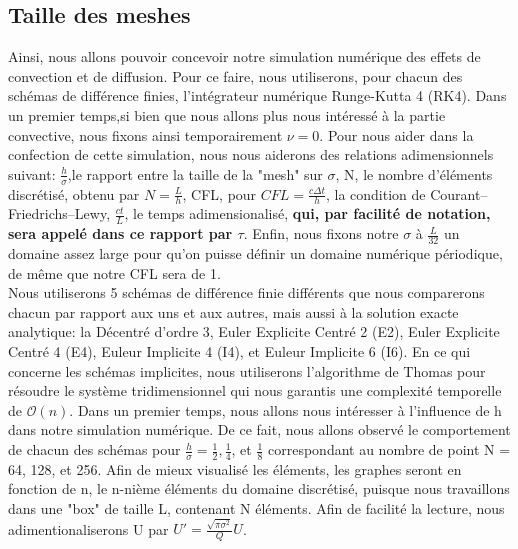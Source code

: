 \documentclass{article}
\begin{document}
\subsection{Taille des meshes}
Ainsi, nous allons pouvoir concevoir notre simulation numérique des effets de convection et de diffusion. Pour ce faire, nous utiliserons, pour chacun des schémas de différence finies, l'intégrateur numérique Runge-Kutta 4 (RK4). Dans un premier temps,si bien que nous allons plus nous intéressé à la partie convective, nous fixons ainsi temporairement $\nu = 0$. Pour nous aider dans la confection de cette simulation, nous nous aiderons des relations adimensionnels suivant: $\frac{h}{\sigma}$,le rapport entre la taille de la "mesh" sur $\sigma$, N, le nombre d'éléments discrétisé, obtenu par $N = \frac{L}{h}$, CFL, pour $CFL = \frac{c\Delta t}{h}$, la condition de Courant–Friedrichs–Lewy, $\frac{ct}{L}$, le temps adimensionalisé, \textbf{qui, par facilité de notation, sera appelé dans ce rapport par $\tau$}. Enfin, nous fixons notre $\sigma$ à $\frac{L}{32}$ un domaine assez large pour qu'on puisse définir un domaine numérique périodique, de même que notre CFL sera de 1.\\

Nous utiliserons 5 schémas de différence finie différents que nous comparerons chacun par rapport aux uns et aux autres, mais aussi à la solution exacte analytique: la Décentré d'ordre 3, Euler Explicite Centré 2 (E2), Euler Explicite Centré 4 (E4), Euleur Implicite 4 (I4), et Euleur Implicite 6 (I6). En ce qui concerne les schémas implicites, nous utiliserons l'algorithme de Thomas pour résoudre le système tridimensionnel qui nous garantis une complexité temporelle de $\mathcal{O}(n)$. Dans un premier temps, nous allons nous intéresser à l'influence de h dans notre simulation numérique. De ce fait, nous allons observé le comportement de chacun des schémas pour $\frac{h}{\sigma} = \frac{1}{2}, \frac{1}{4}$, et $\frac{1}{8}$ correspondant au nombre de point N = 64, 128, et 256. Afin de mieux visualisé les éléments, les graphes seront en fonction de n, le n-nième éléments du domaine discrétisé, puisque nous travaillons dans une "box" de taille L, contenant N éléments. Afin de facilité la lecture, nous adimentionaliserons U par $U' = \frac{\sqrt{\pi \sigma^2}}{Q} U$.\\
\end{document}
